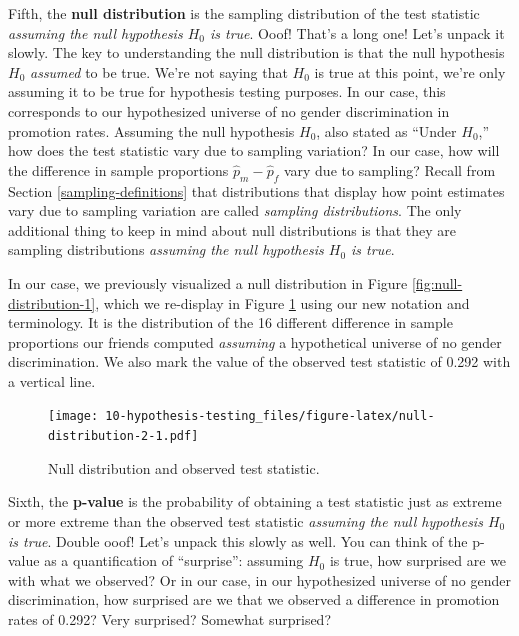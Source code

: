 \documentclass[
]{book}
\begin{document}
Fifth, the \textbf{null distribution}  is the sampling distribution of the test statistic \emph{assuming the null hypothesis \(H_0\) is true}. Ooof! That's a long one! Let's unpack it slowly. The key to understanding the null distribution is that the null hypothesis \(H_0\) \emph{assumed} to be true. We're not saying that \(H_0\) is true at this point, we're only assuming it to be true for hypothesis testing purposes. In our case, this corresponds to our hypothesized universe of no gender discrimination in promotion rates. Assuming the null hypothesis \(H_0\), also stated as ``Under \(H_0\),'' how does the test statistic vary due to sampling variation? In our case, how will the difference in sample proportions \(\widehat{p}_{m} - \widehat{p}_{f}\) vary due to sampling? Recall from Section \ref{sampling-definitions} that distributions that display how point estimates vary due to sampling variation are called \emph{sampling distributions}. The only additional thing to keep in mind about null distributions is that they are sampling distributions \emph{assuming the null hypothesis \(H_0\) is true}.

In our case, we previously visualized a null distribution in Figure \ref{fig:null-distribution-1}, which we re-display in Figure \ref{fig:null-distribution-2} using our new notation and terminology. It is the distribution of the 16 different difference in sample proportions our friends computed \emph{assuming} a hypothetical universe of no gender discrimination. We also mark the value of the observed test statistic of 0.292 with a vertical line.

\begin{figure}
\centering
\texttt{[image: 10-hypothesis-testing\_files/figure-latex/null-distribution-2-1.pdf]}
\caption{\label{fig:null-distribution-2}Null distribution and observed test statistic.}
\end{figure}

Sixth, the \textbf{p-value}  is the probability of obtaining a test statistic just as extreme or more extreme than the observed test statistic \emph{assuming the null hypothesis \(H_0\) is true}. Double ooof! Let's unpack this slowly as well. You can think of the p-value as a quantification of ``surprise'': assuming \(H_0\) is true, how surprised are we with what we observed? Or in our case, in our hypothesized universe of no gender discrimination, how surprised are we that we observed a difference in promotion rates of 0.292? Very surprised? Somewhat surprised?
\end{document}
